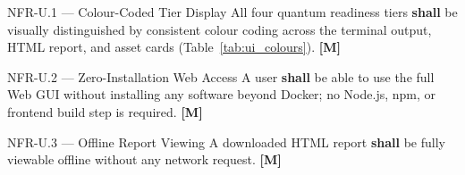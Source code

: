 \begin{reqbox}{NFR-U.1 — Colour-Coded Tier Display}
  All four quantum readiness tiers \textbf{shall} be visually distinguished
  by consistent colour coding across the terminal output, HTML report, and
  asset cards (Table~\ref{tab:ui_colours}). \hfill \textbf{[M]}
\end{reqbox}

\begin{reqbox}{NFR-U.2 — Zero-Installation Web Access}
  A user \textbf{shall} be able to use the full Web GUI without installing any
  software beyond Docker; no Node.js, npm, or frontend build step is required.
  \hfill \textbf{[M]}
\end{reqbox}

\begin{reqbox}{NFR-U.3 — Offline Report Viewing}
  A downloaded HTML report \textbf{shall} be fully viewable offline without
  any network request. \hfill \textbf{[M]}
\end{reqbox}
